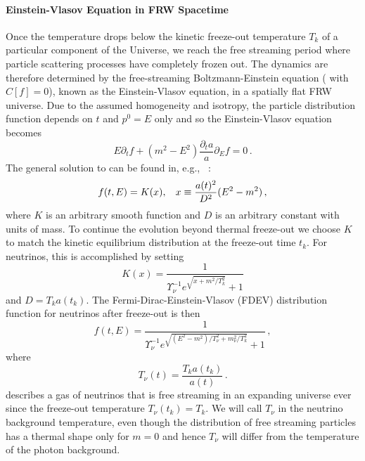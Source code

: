 \paragraph{Einstein-Vlasov Equation in FRW Spacetime}\label{sec:free_stream_sol}
Once the temperature drops below the kinetic freeze-out temperature $T_k$ of a particular component of the Universe, we reach  the free streaming period where  particle scattering processes have completely frozen out. The   dynamics are therefore determined by the free-streaming Boltzmann-Einstein equation ( with $C[f]=0$), known as the Einstein-Vlasov equation, in a spatially flat FRW universe.  Due to the assumed homogeneity and isotropy, the particle distribution function depends on $t$ and $p^0=E$ only and so the Einstein-Vlasov equation becomes
\begin{equation}\label{VEeqFLR}
E\partial_tf+(m^2-E^2)\frac{\partial_ta}{a}\partial_{E}f=0\,.
\end{equation}
The general solution to  can be found in, e.g., ~\cite{Choquet-Bruhat:2009xil,Wong:2011ip}:
\begin{equation}\label{general_sol}
f(t,E)=K(x),\hspace{3mm} x\equiv\frac{a(t)^2}{D^2}(E^2-m^2)\,,
\end{equation}
where $K$ is an arbitrary smooth function and $D$ is an arbitrary constant with units of mass.  To continue the evolution beyond thermal freeze-out  we choose $K$ to match the kinetic equilibrium distribution  at the freeze-out time $t_k$. For neutrinos, this is accomplished by setting
\begin{equation}\label{K_func}
K(x)=\frac{1}{\Upsilon_\nu^{-1}e^{\sqrt{x+m^2/T_k^2}}+ 1}
\end{equation}
and $D=T_k a(t_k)$. The Fermi-Dirac-Einstein-Vlasov (FDEV) distribution function for neutrinos after freeze-out is then
\begin{equation}\label{neutrino_dist}
f(t,E)=\frac{1}{\Upsilon_\nu^{-1}e^{\sqrt{(E^2-m^2)/T_\nu^2+m_\nu^2 /T_k^2}}+ 1}\,,
\end{equation}
where 
\begin{equation}\label{Tneutrino_dist}
T_\nu(t)=\frac{T_ka(t_k)}{a(t)}\,.  
\end{equation}
 describes a gas of neutrinos that is free streaming in an expanding universe ever since the freeze-out temperature $T_\nu(t_k)=T_k$. We will call $T_\nu$ in  the neutrino background temperature, even though  the distribution of free streaming particles has a thermal shape only for $m=0$ and hence $T_{\nu}$ will differ from the temperature of the photon background.   

